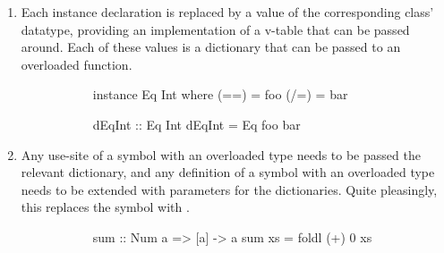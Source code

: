 \documentclass[dissertation.tex]{subfiles}
\begin{document}
{{{\begin{enumerate}
{\begin{figure}[H]
\begin{subfigure}[t]{0.55\textwidth}
\begin{haskellfigure}
                (==), (/=) :: Eq a -> a -> a -> Bool
                (==) (Eq eq _) = eq
                (/=) (Eq _ neq) = neq
                \end{haskellfigure}
                \end{subfigure}
                \end{figure}
            }
            \item
            {
                Each instance declaration is replaced by a value of the corresponding class' datatype, providing an
                implementation of a v-table that can be passed around. Each of these values is a dictionary that can be
                passed to an overloaded function.

                \begin{figure}[H]
                \centering
                \begin{subfigure}[t]{0.25\textwidth}
                \begin{haskellfigure}
                instance Eq Int where
                    (==) = foo
                    (/=) = bar
                \end{haskellfigure}
                \end{subfigure}
                \hspace{5mm}
                \begin{subfigure}[t]{0.25\textwidth}
                \begin{haskellfigure}
                dEqInt :: Eq Int
                dEqInt = Eq foo bar
                \end{haskellfigure}
                \end{subfigure}
                \end{figure}
            }
            \item
            {
                Any use-site of a symbol with an overloaded type needs to be passed the relevant dictionary, and any definition of a symbol with an overloaded type needs to be extended with parameters for the dictionaries. Quite pleasingly, this replaces the \haskell{=>} symbol with \haskell{->}.

                \begin{figure}[H]
                \centering
                \begin{subfigure}[t]{0.30\textwidth}
                \begin{haskellfigure}
                sum :: Num a => [a] -> a
                sum xs = foldl (+) 0 xs


\end{haskellfigure}
\end{subfigure}
\end{figure}}
\end{enumerate}}}}
\end{document}
